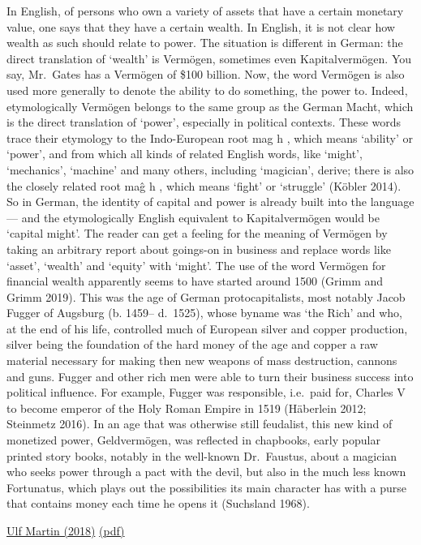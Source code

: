 \documentclass[
]{book}
\begin{document}
In English, of persons who own a variety of assets that have a certain monetary value,
one says that they have a certain wealth. In English, it is not clear how wealth as such
should relate to power. The situation is different in German: the direct translation of
`wealth' is Vermögen, sometimes even Kapitalvermögen. You say, Mr.~Gates has a
Vermögen of \$100 billion. Now, the word Vermögen is also used more generally to
denote the ability to do something, the power to. Indeed, etymologically Vermögen
belongs to the same group as the German Macht, which is the direct translation of
`power', especially in political contexts. These words trace their etymology to the
Indo-European root mag h , which means `ability' or `power', and from which all kinds
of related English words, like `might', `mechanics', `machine' and many others,
including `magician', derive; there is also the closely related root maĝ h , which means
`fight' or `struggle' (Köbler 2014).
So in German, the identity of capital and power is already built into the language---
and the etymologically English equivalent to Kapitalvermögen would be `capital
might'. The reader can get a feeling for the meaning of Vermögen by taking an
arbitrary report about goings-on in business and replace words like `asset', `wealth'
and `equity' with `might'. The use of the word Vermögen for financial wealth
apparently seems to have started around 1500 (Grimm and Grimm 2019). This was
the age of German protocapitalists, most notably Jacob Fugger of Augsburg (b. 1459--
d.~1525), whose byname was `the Rich' and who, at the end of his life, controlled much
of European silver and copper production, silver being the foundation of the hard
money of the age and copper a raw material necessary for making then new weapons
of mass destruction, cannons and guns. Fugger and other rich men were able to turn
their business success into political influence. For example, Fugger was responsible,
i.e.~paid for, Charles V to become emperor of the Holy Roman Empire in 1519
(Häberlein 2012; Steinmetz 2016). In an age that was otherwise still feudalist, this
new kind of monetized power, Geldvermögen, was reflected in chapbooks, early
popular printed story books, notably in the well-known Dr.~Faustus, about a magician
who seeks power through a pact with the devil, but also in the much less known
Fortunatus, which plays out the possibilities its main character has with a purse that
contains money each time he opens it (Suchsland 1968).

\href{http://bnarchives.yorku.ca/606/}{Ulf Martin (2018)}
\href{pdf/Ulf_Martin_2019_Autocatalytic_sprawl.pdf}{(pdf)}
\end{document}
